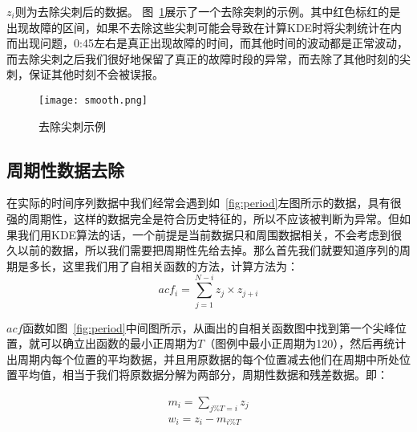 $z_i$则为去除尖刺后的数据。
图~\ref{fig:smooth}展示了一个去除突刺的示例。其中红色标红的是出现故障的区间，如果不去除这些尖刺可能会导致在计算KDE时将尖刺统计在内而出现问题，0:45左右是真正出现故障的时间，而其他时间的波动都是正常波动，而去除尖刺之后我们很好地保留了真正的故障时段的异常，而去除了其他时刻的尖刺，保证其他时刻不会被误报。

\begin{figure}[htbp]
  \centering
  \texttt{[image: smooth.png]}
  \caption{去除尖刺示例}
  \label{fig:smooth}
\end{figure}
\subsection{周期性数据去除}

在实际的时间序列数据中我们经常会遇到如~\ref{fig:period}左图所示的数据，具有很强的周期性，这样的数据完全是符合历史特征的，所以不应该被判断为异常。但如果我们用KDE算法的话，一个前提是当前数据只和周围数据相关，不会考虑到很久以前的数据，所以我们需要把周期性先给去掉。那么首先我们就要知道序列的周期是多长，这里我们用了自相关函数的方法，计算方法为：
\begin{equation*}
  acf_i = \sum_{j=1}^{N-i}z_j\times z_{j+i}
\end{equation*}

$acf$函数如图~\ref{fig:period}中间图所示，从画出的自相关函数图中找到第一个尖峰位置，就可以确立出函数的最小正周期为$T$（图例中最小正周期为120），然后再统计出周期内每个位置的平均数据，并且用原数据的每个位置减去他们在周期中所处位置平均值，相当于我们将原数据分解为两部分，周期性数据和残差数据。即：

\begin{equation*}
  \begin{aligned}
  m_i = \sum_{j\%T = i}z_j\\
  w_i = z_i - m_{i\%T}
  \end{aligned}
\end{equation*}


